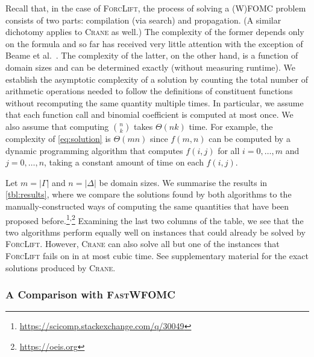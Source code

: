 \documentclass{article}
\begin{document}
Recall that, in the case of \textsc{ForcLift}, the process of solving a (W)FOMC
problem consists of two parts: compilation (via search) and propagation. (A
similar dichotomy applies to \textsc{Crane} as well.) The complexity of the
former depends only on the formula and so far has received very little attention
with the exception of Beame et al.~. The
complexity of the latter, on the other hand, is a function of domain sizes and
can be determined exactly (without measuring runtime). We establish the
asymptotic complexity of a solution by counting the total number of arithmetic
operations needed to follow the definitions of constituent functions without
recomputing the same quantity multiple times. In particular, we assume that each
function call and binomial coefficient is computed at most once. We also assume
that computing $\binom{n}{k}$ takes $\Theta(nk)$ time. For example, the
complexity of \cref{eq:solution} is $\Theta(mn)$ since $f(m, n)$ can be computed
by a dynamic programming algorithm that computes $f(i, j)$ for all
$i = 0, \dots, m$ and $j = 0, \dots, n$, taking a constant amount of time on
each $f(i, j)$.


Let $m = |\Gamma|$ and $n = |\Delta|$ be domain sizes. We summarise the results
in \cref{tbl:results}, where we compare the solutions found by both algorithms
to the manually-constructed ways of computing the same quantities that have been
proposed
before.\footnote{\url{https://scicomp.stackexchange.com/q/30049}}\textsuperscript{,}\footnote{\url{https://oeis.org}}
Examining the last two columns of the table, we see that the two algorithms
perform equally well on instances that could already be solved by
\textsc{ForcLift}. However, \textsc{Crane} can also solve all but one of the
instances that \textsc{ForcLift} fails on in at most cubic time. See
supplementary material for the exact solutions produced by \textsc{Crane}.

\subsubsection{A Comparison with \textsc{\normalfont FastWFOMC}}
\end{document}
